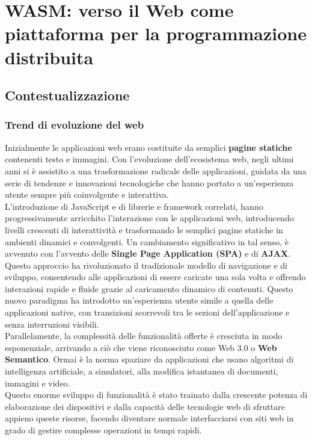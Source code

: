 \chapter{WASM: verso il Web come piattaforma per la programmazione distribuita}
\label{chap:1}

\section{Contestualizzazione}
\label{sec:Contestualizzazione}

\subsection{Trend di evoluzione del web}
Inizialmente le applicazioni web erano costituite da semplici \textbf{pagine statiche} contenenti testo e immagini.
Con l'evoluzione dell'ecosistema web, negli ultimi anni si è assistito a una trasformazione radicale delle applicazioni, guidata da una serie di tendenze e innovazioni tecnologiche che hanno portato a un'esperienza utente sempre più coinvolgente e interattiva.
\\L'introduzione di JavaScript e di librerie e framework correlati, hanno progressivamente arricchito l'interazione con le applicazioni web, introducendo livelli crescenti di interattività e trasformando le semplici pagine statiche in ambienti dinamici e convolgenti. 
Un cambiamento significativo in tal senso, è avvenuto con l'avvento delle \textbf{Single Page Application (SPA)} e di \textbf{AJAX}.
Questo approccio ha rivoluzionato il tradizionale modello di navigazione e di sviluppo, consentendo alle applicazioni di essere caricate una sola volta e offrendo interazioni rapide e fluide grazie al caricamento dinamico di contenuti. Questo nuovo paradigma ha introdotto un'esperienza utente simile a quella delle applicazioni native, con transizioni scorrevoli tra le sezioni dell'applicazione e senza interruzioni visibili.
\\Parallelamente, la complessità delle funzionalità offerte è cresciuta in modo esponenziale, arrivando a ciò che viene riconosciuto come Web 3.0 o \textbf{Web Semantico}. Ormai è la norma spaziare da applicazioni che usano algoritmi di intelligenza artificiale, a simulatori, alla modifica istantanea di documenti, immagini e video.
\\Questo enorme sviluppo di funzionalità è stato trainato dalla crescente potenza di elaborazione dei dispositivi e dalla capacità delle tecnologie web di sfruttare appieno queste risorse, facendo diventare normale interfacciarsi con siti web in grado di gestire complesse operazioni in tempi rapidi.
